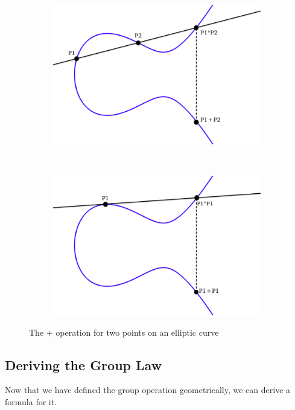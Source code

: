 \documentclass{article}
\begin{document}
\begin{figure}[h]
\centering

\begin{subfigure}{.5\textwidth}
	\centering
	\includegraphics[width=1\linewidth]{images/ec4-plus.png}
	\label{fig:ec-plus-1}
\end{subfigure}%
~%
\begin{subfigure}{.5\textwidth}
	\centering
	\includegraphics[width=1\linewidth]{images/ec4-plus-tangent.png}
	\label{fig:ec-plus-2}
\end{subfigure}

\caption{The $+$ operation for two points on an elliptic curve}

\label{fig:ec-plus}
\end{figure}

\subsection{Deriving the Group Law}
Now that we have defined the group operation geometrically, we can derive a formula for it.
\end{document}
